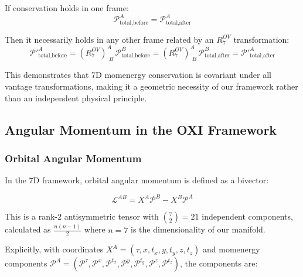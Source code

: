 \documentclass{article}
\begin{document}
If conservation holds in one frame:
\begin{equation}
\mathcal{P}^A_{\text{total,before}} = \mathcal{P}^A_{\text{total,after}}
\end{equation}

Then it necessarily holds in any other frame related by an $R^{OV}_7$ transformation:
\begin{equation}
\mathcal{P}'^A_{\text{total,before}} = (R^{OV}_7)^A_{\,\,B} \, \mathcal{P}^B_{\text{total,before}} = (R^{OV}_7)^A_{\,\,B} \, \mathcal{P}^B_{\text{total,after}} = \mathcal{P}'^A_{\text{total,after}}
\end{equation}

This demonstrates that 7D momenergy conservation is covariant under all vantage transformations, making it a geometric necessity of our framework rather than an independent physical principle.

\subsection{Angular Momentum in the OXI Framework}

\subsubsection{Orbital Angular Momentum}

In the 7D framework, orbital angular momentum is defined as a bivector:

\begin{equation}
\mathcal{L}^{AB} = X^A \mathcal{P}^B - X^B \mathcal{P}^A
\end{equation}

This is a rank-2 antisymmetric tensor with $\binom{7}{2} = 21$ independent components, calculated as $\frac{n(n-1)}{2}$ where $n=7$ is the dimensionality of our manifold. 

Explicitly, with coordinates $X^A = (\tau, x, t_x, y, t_y, z, t_z)$ and momenergy components $\mathcal{P}^A = (\mathcal{P}^\tau, \mathcal{P}^x, \mathcal{P}^{t_x}, \mathcal{P}^y, \mathcal{P}^{t_y}, \mathcal{P}^z, \mathcal{P}^{t_z})$, the components are:
\end{document}
